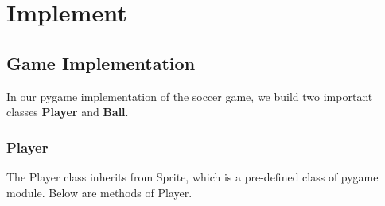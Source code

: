 \documentclass[14pt]{extarticle}
\begin{document}

\section{Implement}

\subsection{Game Implementation}

In our pygame implementation of the soccer game, we build two important classes \textbf{Player} and \textbf{Ball}.

\subsubsection{Player}
The Player class inherits from Sprite, which is a pre-defined class of pygame module. Below are methods of Player.
\end{document}
